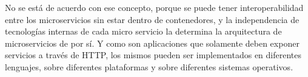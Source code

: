 No se está de acuerdo con ese concepto, porque se puede tener interoperabilidad entre los microservicios sin estar dentro de contenedores, y la independencia de tecnologías internas de cada micro servicio la determina la arquitectura de microservicios de por sí. Y como son aplicaciones que solamente deben exponer servicios a través de HTTP, los mismos pueden ser implementados en diferentes lenguajes, sobre diferentes plataformas y sobre diferentes sistemas operativos.
